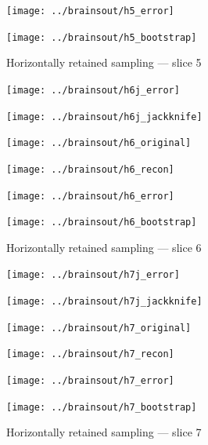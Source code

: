 \documentclass[article]{jdssv}
\begin{document}
\begin{appendix}
\begin{figure}
\begin{centering}
\parbox{\imsize}{\texttt{[image: ../brainsout/h5\_error]}}
\parbox{\imsize}{\texttt{[image: ../brainsout/h5\_bootstrap]}}

\end{centering}
\caption{Horizontally retained sampling --- slice 5}
\end{figure}


\begin{figure}
\begin{centering}

\parbox{\imsize}{\texttt{[image: ../brainsout/h6j\_error]}}
\parbox{\imsize}{\texttt{[image: ../brainsout/h6j\_jackknife]}}

\vspace{\vertsep}

\parbox{\imsize}{\texttt{[image: ../brainsout/h6\_original]}}
\parbox{\imsize}{\texttt{[image: ../brainsout/h6\_recon]}}

\vspace{\vertsep}

\parbox{\imsize}{\texttt{[image: ../brainsout/h6\_error]}}
\parbox{\imsize}{\texttt{[image: ../brainsout/h6\_bootstrap]}}

\end{centering}
\caption{Horizontally retained sampling --- slice 6}
\end{figure}


\begin{figure}
\begin{centering}

\parbox{\imsize}{\texttt{[image: ../brainsout/h7j\_error]}}
\parbox{\imsize}{\texttt{[image: ../brainsout/h7j\_jackknife]}}

\vspace{\vertsep}

\parbox{\imsize}{\texttt{[image: ../brainsout/h7\_original]}}
\parbox{\imsize}{\texttt{[image: ../brainsout/h7\_recon]}}

\vspace{\vertsep}

\parbox{\imsize}{\texttt{[image: ../brainsout/h7\_error]}}
\parbox{\imsize}{\texttt{[image: ../brainsout/h7\_bootstrap]}}

\end{centering}
\caption{Horizontally retained sampling --- slice 7}
\end{figure}


\begin{figure}
\begin{centering}


\end{centering}
\end{figure}
\end{appendix}
\end{document}
